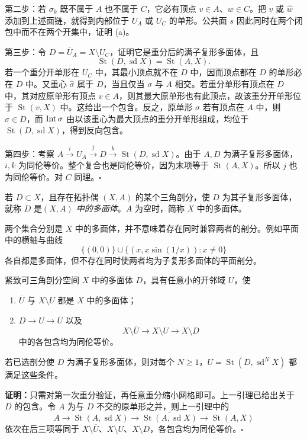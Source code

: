 第二步：若 $\sigma_k$ 既不属于 $A$ 也不属于 $C$，它必有顶点 $v\in A$、$w\in C$。把 $\widehat v$ 或 $\widehat w$ 添加到上述面链，就得到内部位于 $U_A$ 或 $U_C$ 的单形。公共面 $s$ 因此同时在两个闭包中而不在两个开集中，证明 (a)。

第三步：令 $D=\overline U_A=X\setminus U_C$，证明它是重分后的满子复形多面体，且
\[\operatorname{St}(D,\operatorname{sd}X)=\operatorname{St}(A,X).\]
若一个重分开单形在 $U_C$ 中，其最小顶点就不在 $D$ 中，因而顶点都在 $D$ 的单形必在 $D$ 中。又重心 $\widehat\sigma$ 属于 $D$，当且仅当 $\sigma$ 与 $A$ 相交。若重分单形有顶点在 $D$ 中，其对应原单形有顶点 $v\in A$，则其最大原单形也有此顶点，故该重分开单形位于 $\operatorname{St}(v,X)$ 中。这给出一个包含。反之，原单形 $\sigma$ 若有顶点在 $A$ 中，则 $\widehat\sigma\in D$，而 $\operatorname{Int}\sigma$ 由以该重心为最大顶点的重分开单形组成，均位于 $\operatorname{St}(D,\operatorname{sd}X)$，得到反向包含。

第四步：考察 $A\xrightarrow{i}U_A\xrightarrow{j}D\xrightarrow{k}\operatorname{St}(D,\operatorname{sd}X)$。由于 $A,D$ 为满子复形多面体，$i,k$ 为同伦等价。整个复合也是同伦等价，因为末项等于 $\operatorname{St}(A,X)$。所以 $j$ 也为同伦等价。对 $C$ 同理。\hfill$\square$

若 $D\subset X$，且存在拓扑偶 $(X,A)$ 的某个三角剖分，使 $D$ 为其子复形多面体，就称 $D$ 是\emph{$(X,A)$ 中的多面体}。$A$ 为空时，简称 $X$ 中的多面体。

两个集合分别是 $X$ 中的多面体，并不意味着存在同时兼容两者的剖分。例如平面中的横轴与曲线
\[\{(0,0)\}\cup\{(x,x\sin(1/x)):x\ne0\}\]
各自都是多面体，但不存在同时使两者均为子复形多面体的平面剖分。

紧致可三角剖分空间 $X$ 中的多面体 $D$，具有任意小的开邻域 $U$，使
\begin{enumerate}[label=(\alph*)]
\item $\overline U$ 与 $X\setminus U$ 都是 $X$ 中的多面体；
\item $D\to U\to\overline U$ 以及
\[X\setminus\overline U\to X\setminus U\to X\setminus D\]
中的各包含均为同伦等价。
\end{enumerate}

若已选剖分使 $D$ 为满子复形多面体，则对每个 $N\ge1$，$U=\operatorname{St}(D,\operatorname{sd}^NX)$ 都满足这些条件。

\textbf{证明：}只需对第一次重分验证，再任意重分缩小网格即可。上一引理已给出关于 $D$ 的包含。令 $A$ 为与 $D$ 不交的原单形之并，则上一引理中的
\[A\to\operatorname{St}(A,\operatorname{sd}X)\to
\overline{\operatorname{St}(A,\operatorname{sd}X)}\to\operatorname{St}(A,X)\]
依次在后三项等同于 $X\setminus\overline U$、$X\setminus U$、$X\setminus D$，各包含均为同伦等价。\hfill$\square$

